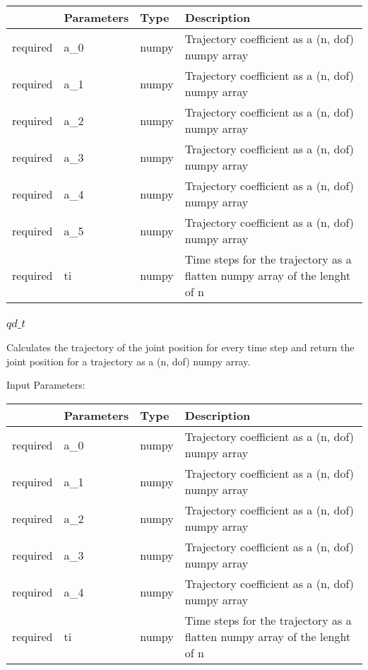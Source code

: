 \documentclass[
	ngerman,
	accentcolor=9c,%
	type=intern,
	marginpar=false
	]{tudapub}
\begin{document}
\begin{tabular}{|p{}|p{}|p{}| p{}|}
\hline
 & \textbf{Parameters} & \textbf{Type} & \textbf{Description} \\
\hline
required & a\_0 & numpy & Trajectory coefficient as a (n, dof) numpy array \\
\hline
required & a\_1 & numpy & Trajectory coefficient as a (n, dof) numpy array \\
\hline
required & a\_2 & numpy & Trajectory coefficient as a (n, dof) numpy array \\
\hline
required & a\_3 & numpy & Trajectory coefficient as a (n, dof) numpy array \\
\hline
required & a\_4 & numpy & Trajectory coefficient as a (n, dof) numpy array \\
\hline
required & a\_5 & numpy & Trajectory coefficient as a (n, dof) numpy array \\
\hline
required & ti & numpy & Time steps for the trajectory as a flatten numpy array of the lenght of n \\
\hline
\end{tabular}
\vspace{1cm}


\subsubsection{$qd\_t$}
\noindent Calculates the trajectory of the joint position for every time step and return the joint position for a trajectory as a (n, dof) numpy array.

\vspace{0.5cm}
\noindent Input Parameters:
\vspace{0.5cm}

\begin{tabular}{|p{}|p{}|p{}| p{}|}
\hline
 & \textbf{Parameters} & \textbf{Type} & \textbf{Description} \\
\hline
required & a\_0 & numpy & Trajectory coefficient as a (n, dof) numpy array \\
\hline
required & a\_1 & numpy & Trajectory coefficient as a (n, dof) numpy array \\
\hline
required & a\_2 & numpy & Trajectory coefficient as a (n, dof) numpy array \\
\hline
required & a\_3 & numpy & Trajectory coefficient as a (n, dof) numpy array \\
\hline
required & a\_4 & numpy & Trajectory coefficient as a (n, dof) numpy array \\
\hline
required & ti & numpy & Time steps for the trajectory as a flatten numpy array of the lenght of n \\
\hline
\end{tabular}
\vspace{1cm}
\end{document}
